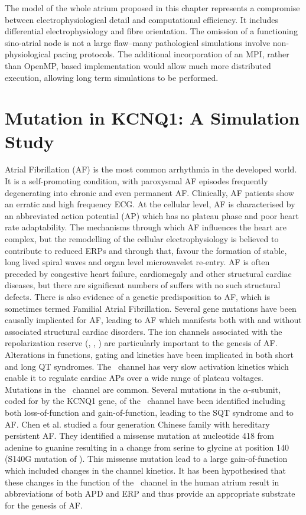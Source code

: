 The model of the whole atrium proposed in this chapter represents a compromise
between electrophysiological detail and computational efficiency.
It includes differential electrophysiology and fibre orientation.
The omission of a functioning sino-atrial node is not a large flaw--many
pathological simulations involve non-physiological pacing protocols.
The additional incorporation of an MPI, rather than OpenMP, based implementation
would allow much more distributed execution, allowing long term simulations to
be performed.



\section{Mutation in KCNQ1: A Simulation Study}

Atrial Fibrillation (AF) is the most common arrhythmia in the developed world.
It is a self-promoting condition, with paroxysmal AF episodes frequently
degenerating into chronic and even permanent AF.
Clinically, AF patients show an erratic and high frequency ECG.
At the cellular level, AF is characterised by an abbreviated action potential
(AP) which has no plateau phase and poor heart rate adaptability.
The mechanisms through which AF influences the heart are complex, but the
remodelling of the cellular electrophysiology is believed to contribute to
reduced ERPs and through that, favour the formation of stable, long lived
spiral waves and organ level microwavelet re-entry.
AF is often preceded by congestive heart failure, cardiomegaly and other
structural cardiac diseases, but there are significant numbers of suffers with
no such structural defects.
There is also evidence of a genetic predisposition to AF, which is sometimes
termed Familial Atrial Fibrillation.
Several gene mutations have been causally implicated for AF, leading to AF
which manifests both with and without associated structural cardiac disorders.
The ion channels associated with the repolarization reserve (, ,
) are particularly important to the genesis of AF.
Alterations in functions, gating and kinetics have been implicated in both short
and long QT syndromes.
The \ channel has very slow activation kinetics which enable it to
regulate cardiac APs over a wide range of plateau voltages.
Mutations in the \ channel are common.
Several mutations in the $\alpha$-subunit, coded for by the KCNQ1 gene, of the
\ channel have been identified including both loss-of-function and
gain-of-function, leading to the SQT syndrome and to AF.
Chen et al. studied a four generation Chinese family with hereditary persistent
AF.
They identified a missense mutation at nucleotide 418 from adenine to guanine
resulting in a change from serine to glycine at position 140 (S140G mutation of
).
This missense mutation lead to a large gain-of-function which included changes
in the channel kinetics.
It has been hypothesised that these changes in the function of the \
channel in the human atrium result in abbreviations of both APD and ERP and thus
provide an appropriate substrate for the genesis of AF.

